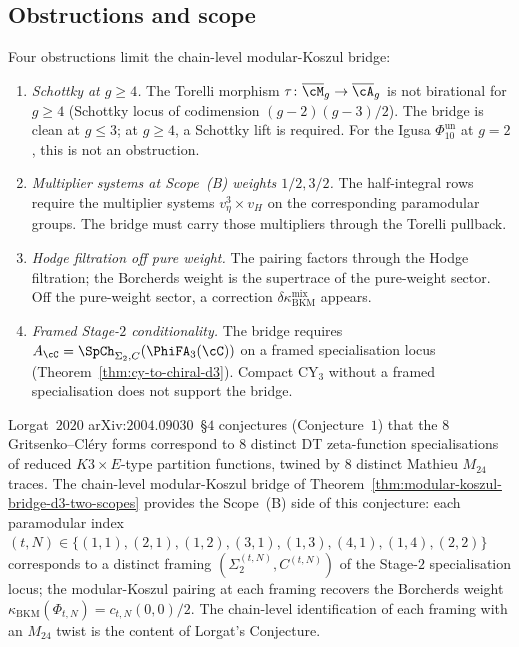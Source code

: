\subsection{Obstructions and scope}

\begin{remark}
\label{rem:modular-koszul-bridge-obstructions}
Four obstructions limit the chain-level modular-Koszul bridge:
\begin{enumerate}[label=\textup{(O\arabic*)}]
\item \emph{Schottky at $g \geq 4$.} The Torelli morphism
$\tau \colon \overline{\cM}_g \to \overline{\cA}_g$ is not birational
for $g \geq 4$ (Schottky locus of codimension $(g - 2)(g - 3)/2$). The
bridge is clean at $g \leq 3$; at $g \geq 4$, a Schottky lift is
required. For the Igusa $\Phi_{10}^{\mathrm{un}}$ at $g = 2$, this is not an
obstruction.
\item \emph{Multiplier systems at Scope~(B) weights $1/2, 3/2$.} The
half-integral rows require the multiplier systems \(v_\eta^3\times v_H\)
on the corresponding paramodular groups. The bridge must carry those
multipliers through the Torelli pullback.
\item \emph{Hodge filtration off pure weight.} The pairing factors
through the Hodge filtration; the Borcherds weight is the supertrace
of the pure-weight sector. Off the pure-weight sector, a correction
$\delta \kappa_{\mathrm{BKM}}^{\mathrm{mix}}$ appears.
\item \emph{Framed Stage-$2$ conditionality.} The bridge requires
$A_\cC = \SpCh_{\Sigma_2, C}(\PhiFA_3(\cC))$ on a framed specialisation
locus (Theorem~\ref{thm:cy-to-chiral-d3}). Compact CY$_3$ without a
framed specialisation does not support the bridge.
\end{enumerate}
\end{remark}

\begin{remark}
\label{rem:lorgat-conj1-two-scope-chapter}
Lorgat~$2020$ arXiv:$2004.09030$~\S$4$ conjectures (Conjecture~$1$)
that the $8$ Gritsenko--Cl\'ery forms correspond to $8$ distinct DT
zeta-function specialisations of reduced $K3 \times E$-type partition
functions, twined by $8$ distinct Mathieu $M_{24}$ traces. The
chain-level modular-Koszul bridge of
Theorem~\ref{thm:modular-koszul-bridge-d3-two-scopes} provides the
Scope~(B) side of this conjecture: each paramodular index
$(t,N)\in\{(1,1),(2,1),(1,2),(3,1),(1,3),(4,1),(1,4),(2,2)\}$
corresponds to a distinct framing
$(\Sigma_2^{(t,N)}, C^{(t,N)})$ of the Stage-$2$ specialisation locus;
the modular-Koszul pairing at each framing recovers the Borcherds
weight $\kappa_{\mathrm{BKM}}(\Phi_{t,N}) = c_{t,N}(0, 0)/2$. The
chain-level identification of each framing with an $M_{24}$ twist is
the content of Lorgat's Conjecture.
\end{remark}

